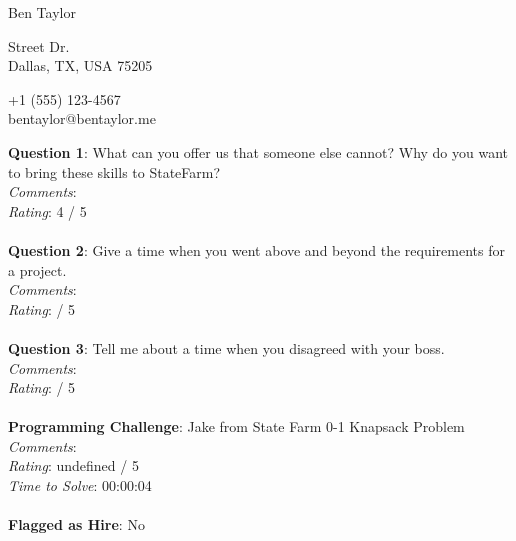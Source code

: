 \documentclass[12pt]{article}
\begin{document}
{\LARGE \begin{center}Ben Taylor\end{center}}

\begin{multicols}{2}
 Street Dr. \\
Dallas, TX, USA 75205
\columnbreak

\noindent
+1 (555) 123-4567 \\
bentaylor@bentaylor.me
\end{multicols}

\noindent
\textbf{Question 1}: What can you offer us that someone else cannot? Why do you want to bring these skills to StateFarm?
\\\noindent
\textit{Comments}: 
\\\noindent
\textit{Rating}: 4 / 5
\\\\
\noindent
\textbf{Question 2}: Give a time when you went above and beyond the requirements for a project.
\\\noindent
\textit{Comments}: 
\\\noindent
\textit{Rating}:  / 5
\\\\
\noindent
\textbf{Question 3}: Tell me about a time when you disagreed with your boss.
\\\noindent
\textit{Comments}: 
\\\noindent
\textit{Rating}:  / 5
\\\\
\noindent
\textbf{Programming Challenge}: Jake from State Farm 0-1 Knapsack Problem
\\\noindent
\textit{Comments}: 
\\\noindent
\textit{Rating}: undefined / 5
\\\noindent
\textit{Time to Solve}: 00:00:04
\\\\
\textbf{Flagged as Hire}: No
\\\\ 
\end{document}
